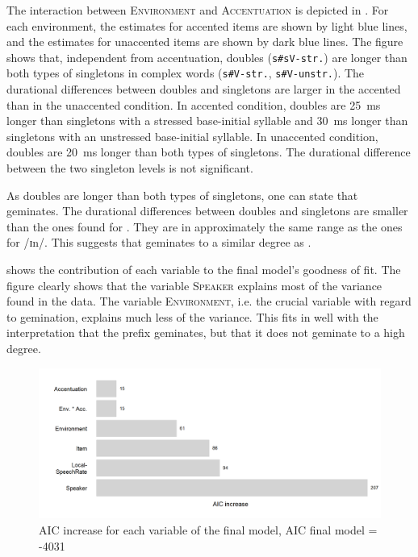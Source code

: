 The interaction between \textsc{Environment} and \textsc{Accentuation} is depicted in . For each environment, the estimates for accented items are shown by light blue lines, and the estimates for unaccented items are shown by dark blue lines.
The figure shows that,  
independent from accentuation, doubles (\texttt{s\#sV-str.}) are longer than both types of singletons in complex words (\texttt{s\#V-str.}, \texttt{s\#V-unstr.}). The durational differences between doubles and singletons are larger in the accented than in the unaccented condition. 
In accented condition, doubles are 25~ms longer than singletons with a stressed base-initial syllable and 30~ms longer than singletons with an unstressed base-initial syllable. 
In unaccented condition, doubles are 20~ms longer than both types of singletons. 
The durational difference between the two singleton levels is not significant.

As doubles are longer than both types of singletons, one can state that  geminates. The durational differences between doubles and singletons are smaller than the ones found for . They are in approximately the same range as the ones for /ɪn/. This suggests that  geminates to a similar degree as .



 shows the contribution of each variable to the final model's goodness of fit.
The figure clearly shows that the variable \textsc{Speaker} explains most of the variance found in the data. The variable 
\textsc{Environment}, i.e. the crucial variable with regard to gemination, explains much less of the variance. This fits in well with the interpretation that the prefix  geminates, but that it does not geminate to a high degree.


\begin{figure}[h!]
	\centering
	\includegraphics[scale=0.7]{images/Experiment/AICdecreaseDisComplex.png}
	\caption{AIC increase for each variable of the final model, AIC final model = -4031}
	\label{fig:Effectsize dis experiment}

\end{figure}



